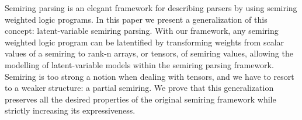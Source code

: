 Semiring parsing is an elegant framework for describing parsers by using semiring weighted logic programs. In this paper we present a generalization of this concept: latent-variable semiring parsing. With our framework, any semiring weighted logic program can be latentified by transforming weights from scalar values of a semiring to rank-n arrays, or tensors, of semiring values, allowing the modelling of latent-variable models within the semiring parsing framework. Semiring is too strong a notion when dealing with tensors, and we have to resort to a weaker structure: a partial semiring. We prove that this generalization preserves all the desired properties of the original semiring framework while strictly increasing its expressiveness.
